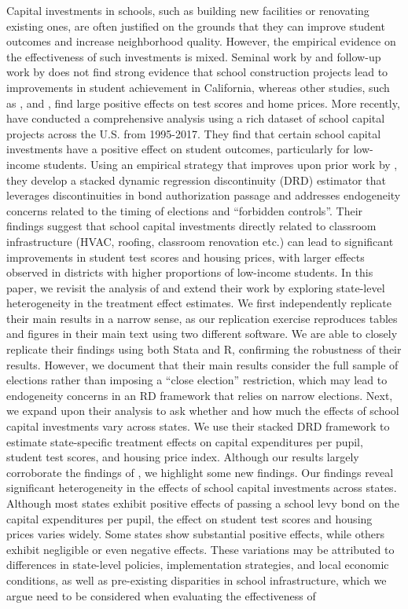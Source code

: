 \documentclass[12pt]{article}
\begin{document}
Capital investments in schools, such as building new facilities or renovating existing ones, are often justified on the grounds that they can improve student outcomes and increase neighborhood quality. However, the empirical evidence on the effectiveness of such investments is mixed. Seminal work by \cite{cellini2010value} and follow-up work by \cite{martorell2016investing} does not find strong evidence that school construction projects lead to improvements in student achievement in California, whereas other studies, such as \cite{neilson2014effect}, \cite{abott2020school} and \cite{baron2022school}, find large positive effects on test scores and home prices. More recently, \cite{biasi_what_2025} have conducted a comprehensive analysis using a rich dataset of school capital projects across the U.S. from 1995-2017. They find that certain school capital investments have a positive effect on student outcomes, particularly for low-income students. Using an empirical strategy that improves upon prior work by \cite{cellini2010value}, they develop a stacked dynamic regression discontinuity (DRD) estimator that leverages discontinuities in bond authorization passage and addresses endogeneity concerns related to the timing of elections and ``forbidden controls''. Their findings suggest that school capital investments directly related to classroom infrastructure (HVAC, roofing, classroom renovation etc.) can lead to significant improvements in student test scores and housing prices, with larger effects observed in districts with higher proportions of low-income students. In this paper, we revisit the analysis of \cite{biasi_what_2025} and extend their work by exploring state-level heterogeneity in the treatment effect estimates. We first independently replicate their main results in a narrow sense, as our replication exercise reproduces tables and figures in their main text using two different software. We are able to closely replicate their findings using both Stata and R, confirming the robustness of their results. However, we document that their main results consider the full sample of elections rather than imposing a ``close election'' restriction, which may lead to endogeneity concerns in an RD framework that relies on narrow elections. Next, we expand upon their analysis to ask whether and how much the effects of school capital investments vary across states. We use their stacked DRD framework to estimate state-specific treatment effects on capital expenditures per pupil, student test scores, and housing price index. Although our results largely corroborate the findings of \cite{biasi_what_2025}, we highlight some new findings. Our findings reveal significant heterogeneity in the effects of school capital investments across states. Although most states exhibit positive effects of passing a school levy bond on the capital expenditures per pupil, the effect on student test scores and housing prices varies widely. Some states show substantial positive effects, while others exhibit negligible or even negative effects. These variations may be attributed to differences in state-level policies, implementation strategies, and local economic conditions, as well as pre-existing disparities in school infrastructure, which we argue need to be considered when evaluating the effectiveness of 
\end{document}
